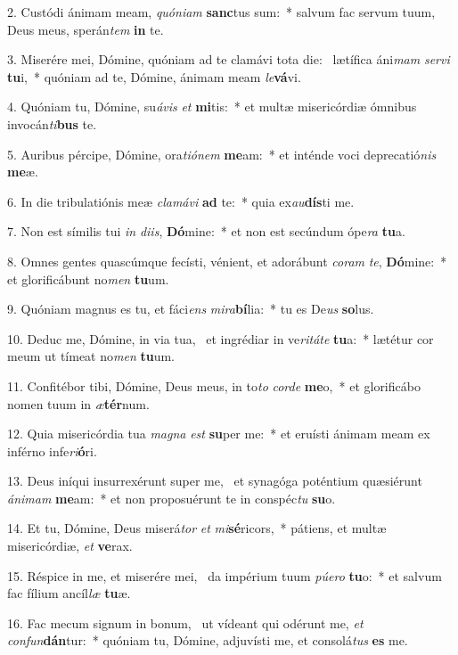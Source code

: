 2. Custódi ánimam meam, \textit{quón}\textit{i}\textit{am} \textbf{sanc}tus sum:~*  salvum fac servum tuum, Deus meus, sperán\textit{tem} \textbf{in} te.\

3. Miserére mei, Dómine, quóniam ad te clamávi tota die: \dag\  lætífica áni\textit{mam} \textit{ser}\textit{vi} \textbf{tu}i,~*  quóniam ad te, Dómine, ánimam meam \textit{le}\textbf{vá}vi.\

4. Quóniam tu, Dómine, su\textit{á}\textit{vis} \textit{et} \textbf{mi}tis:~*  et multæ misericórdiæ ómnibus invocán\textit{ti}\textbf{bus} te.\

5. Auribus pércipe, Dómine, ora\textit{ti}\textit{ó}\textit{nem} \textbf{me}am:~*  et inténde voci deprecatió\textit{nis} \textbf{me}æ.\

6. In die tribulatiónis meæ \textit{cla}\textit{má}\textit{vi} \textbf{ad} te:~*  quia ex\textit{au}\textbf{dís}ti me.\

7. Non est símilis tui \textit{in} \textit{di}\textit{is}, \textbf{Dó}mine:~*  et non est secúndum ópe\textit{ra} \textbf{tu}a.\

8. Omnes gentes quascúmque fecísti, vénient, et adorábunt \textit{co}\textit{ram} \textit{te}, \textbf{Dó}mine:~*  et glorificábunt no\textit{men} \textbf{tu}um.\

9. Quóniam magnus es tu, et fáci\textit{ens} \textit{mi}\textit{ra}\textbf{bí}lia:~*  tu es De\textit{us} \textbf{so}lus.\

10. Deduc me, Dómine, in via tua, \dag\  et ingrédiar in ve\textit{ri}\textit{tá}\textit{te} \textbf{tu}a:~*  lætétur cor meum ut tímeat no\textit{men} \textbf{tu}um.\

11. Confitébor tibi, Dómine, Deus meus, in to\textit{to} \textit{cor}\textit{de} \textbf{me}o,~*  et glorificábo nomen tuum in \textit{æ}\textbf{tér}num.\

12. Quia misericórdia tua \textit{ma}\textit{gna} \textit{est} \textbf{su}per me:~*  et eruísti ánimam meam ex inférno infe\textit{ri}\textbf{ó}ri.\

13. Deus iníqui insurrexérunt super me, \dag\  et synagóga poténtium quæsiérunt \textit{á}\textit{ni}\textit{mam} \textbf{me}am:~*  et non proposuérunt te in conspéc\textit{tu} \textbf{su}o.\

14. Et tu, Dómine, Deus miserá\textit{tor} \textit{et} \textit{mi}\textbf{sé}ricors,~*  pátiens, et multæ misericórdiæ, \textit{et} \textbf{ve}rax.\

15. Réspice in me, et miserére mei, \dag\  da impérium tuum \textit{pú}\textit{e}\textit{ro} \textbf{tu}o:~*  et salvum fac fílium ancíl\textit{læ} \textbf{tu}æ.\

16. Fac mecum signum in bonum, \dag\  ut vídeant qui odérunt me, \textit{et} \textit{con}\textit{fun}\textbf{dán}tur:~*  quóniam tu, Dómine, adjuvísti me, et consolá\textit{tus} \textbf{es} me.\

